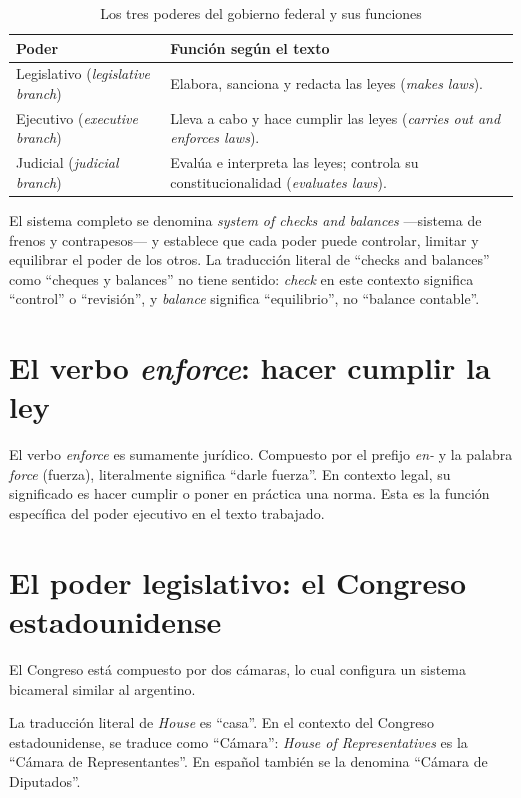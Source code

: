 \documentclass[12pt,oneside]{book}
\begin{document}
\begin{table}[H]
\centering
\caption{Los tres poderes del gobierno federal y sus funciones}
\begin{tabularx}{\textwidth}{>{\raggedright\arraybackslash}p{} >{\raggedright\arraybackslash}X}
\toprule
\textbf{Poder} & \textbf{Función según el texto} \\
\midrule
Legislativo (\textit{legislative branch}) & Elabora, sanciona y redacta las leyes (\textit{makes laws}). \\
Ejecutivo (\textit{executive branch}) & Lleva a cabo y hace cumplir las leyes (\textit{carries out and enforces laws}). \\
Judicial (\textit{judicial branch}) & Evalúa e interpreta las leyes; controla su constitucionalidad (\textit{evaluates laws}). \\
\bottomrule
\end{tabularx}
\end{table}

El sistema completo se denomina \textit{system of checks and balances} ---sistema de frenos y contrapesos--- y establece que cada poder puede controlar, limitar y equilibrar el poder de los otros. La traducción literal de ``checks and balances'' como ``cheques y balances'' no tiene sentido: \textit{check} en este contexto significa ``control'' o ``revisión'', y \textit{balance} significa ``equilibrio'', no ``balance contable''.

\section{El verbo \textit{enforce}: hacer cumplir la ley}

El verbo \textit{enforce} es sumamente jurídico. Compuesto por el prefijo \textit{en-} y la palabra \textit{force} (fuerza), literalmente significa ``darle fuerza''. En contexto legal, su significado es hacer cumplir o poner en práctica una norma. Esta es la función específica del poder ejecutivo en el texto trabajado.

\section{El poder legislativo: el Congreso estadounidense}
\label{sec:congreso}

El Congreso está compuesto por dos cámaras, lo cual configura un sistema bicameral similar al argentino.

\begin{note}
La traducción literal de \textit{House} es ``casa''. En el contexto del Congreso estadounidense, se traduce como ``Cámara'': \textit{House of Representatives} es la ``Cámara de Representantes''. En español también se la denomina ``Cámara de Diputados''.
\end{note}
\end{document}

